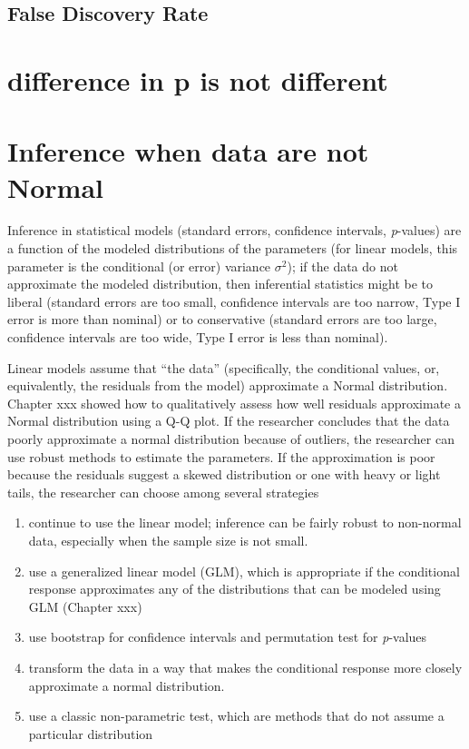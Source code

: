\documentclass[]{book}
\providecommand{\tightlist}{%
  \setlength{\itemsep}{0pt}\setlength{\parskip}{0pt}}
\begin{document}
\subsection{False Discovery Rate}\label{false-discovery-rate-1}

\section{difference in p is not
different}\label{difference-in-p-is-not-different}

\section{Inference when data are not
Normal}\label{inference-when-data-are-not-normal}

Inference in statistical models (standard errors, confidence intervals,
\emph{p}-values) are a function of the modeled distributions of the
parameters (for linear models, this parameter is the conditional (or
error) variance \(\sigma^2\)); if the data do not approximate the
modeled distribution, then inferential statistics might be to liberal
(standard errors are too small, confidence intervals are too narrow,
Type I error is more than nominal) or to conservative (standard errors
are too large, confidence intervals are too wide, Type I error is less
than nominal).

Linear models assume that ``the data'' (specifically, the conditional
values, or, equivalently, the residuals from the model) approximate a
Normal distribution. Chapter xxx showed how to qualitatively assess how
well residuals approximate a Normal distribution using a Q-Q plot. If
the researcher concludes that the data poorly approximate a normal
distribution because of outliers, the researcher can use robust methods
to estimate the parameters. If the approximation is poor because the
residuals suggest a skewed distribution or one with heavy or light
tails, the researcher can choose among several strategies

\begin{enumerate}
\def\labelenumi{\arabic{enumi}.}
\tightlist
\item
  continue to use the linear model; inference can be fairly robust to
  non-normal data, especially when the sample size is not small.
\item
  use a generalized linear model (GLM), which is appropriate if the
  conditional response approximates any of the distributions that can be
  modeled using GLM (Chapter xxx)
\item
  use bootstrap for confidence intervals and permutation test for
  \emph{p}-values
\item
  transform the data in a way that makes the conditional response more
  closely approximate a normal distribution.
\item
  use a classic non-parametric test, which are methods that do not
  assume a particular distribution
\end{enumerate}
\end{document}
